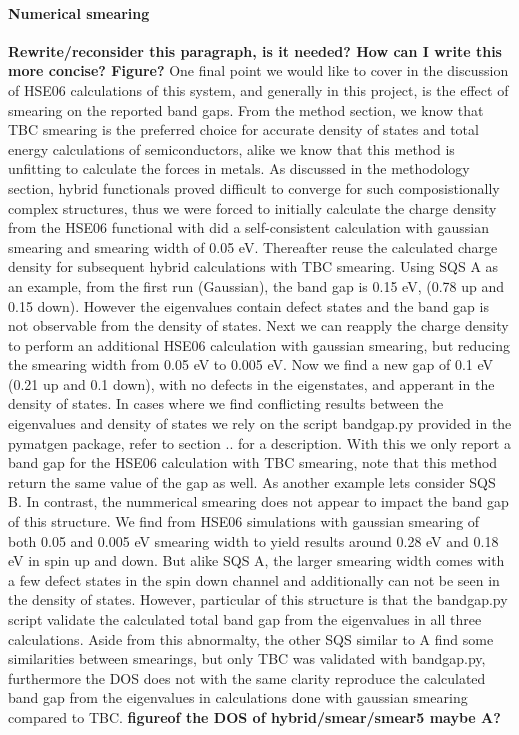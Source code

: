 \paragraph{Numerical smearing \\}
\textbf{Rewrite/reconsider this paragraph, is it needed? How can I write this more concise? Figure?}
One final point we would like to cover in the discussion of HSE06 calculations of this system, and generally in this project, is the effect of smearing on the reported band gaps. From the method section, we know that TBC smearing is the preferred choice for accurate density of states and total energy calculations of semiconductors, alike we know that this method is unfitting to calculate the forces in metals. As discussed in the methodology section, hybrid functionals proved difficult to converge for such composistionally complex structures, thus we were forced to initially calculate the charge density from the HSE06 functional with did a self-consistent calculation with gaussian smearing and smearing width of 0.05 eV. Thereafter reuse the calculated charge density for subsequent hybrid calculations with TBC smearing. Using SQS A as an example, from the first run (Gaussian), the band gap is 0.15 eV, (0.78 up and 0.15 down). However the eigenvalues contain defect states and the band gap is not observable from the density of states. Next we can reapply the charge density to perform an additional HSE06 calculation with gaussian smearing, but reducing the smearing width from 0.05 eV to 0.005 eV. Now we find a new gap of 0.1 eV (0.21 up and 0.1 down), with no defects in the eigenstates, and apperant in the density of states. In cases where we find conflicting results between the eigenvalues and density of states we rely on the script bandgap.py provided in the pymatgen package, refer to section .. for a description. With this we only report a band gap for the HSE06 calculation with TBC smearing, note that this method return the same value of the gap as well. As another example lets consider SQS B. In contrast, the nummerical smearing does not appear to impact the band gap of this structure. We find from HSE06 simulations with gaussian smearing of both 0.05 and 0.005 eV smearing width to yield results around 0.28 eV and 0.18 eV in spin up and down. But alike SQS A, the larger smearing width comes with a few defect states in the spin down channel and additionally can not be seen in the density of states. However, particular of this structure is that the bandgap.py script validate the calculated total band gap from the eigenvalues in all three calculations. Aside from this abnormalty, the other SQS similar to A find some similarities between smearings, but only TBC was validated with bandgap.py, furthermore the DOS does not with the same clarity reproduce the calculated band gap from the eigenvalues in calculations done with gaussian smearing compared to TBC. \textbf{figureof the DOS of hybrid/smear/smear5 maybe A?}

